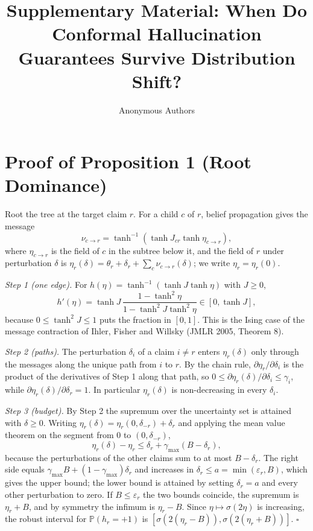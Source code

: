 \documentclass[journal,onecolumn,11pt]{IEEEtran}
\renewcommand{\Pr}{\mathbb{P}}
\begin{document}
\title{Supplementary Material: When Do Conformal Hallucination Guarantees Survive Distribution Shift?}
\author{Anonymous Authors}
\maketitle

\section{Proof of Proposition 1 (Root Dominance)}
Root the tree at the target claim $r$. For a child $c$ of $r$, belief propagation gives the message \[\nu_{c\to r}=\tanh^{-1}(\tanh J_{cr}\tanh\eta_{c\to r}),\] where $\eta_{c\to r}$ is the field of $c$ in the subtree below it, and the field of $r$ under perturbation $\delta$ is $\eta_r(\delta)=\theta_r+\delta_r+\sum_c\nu_{c\to r}(\delta)$; we write $\eta_r=\eta_r(0)$.

\emph{Step 1 (one edge).} For $h(\eta)=\tanh^{-1}(\tanh J\tanh\eta)$ with $J\ge0$,
\[
h'(\eta)=\tanh J\,\frac{1-\tanh^2\eta}{1-\tanh^2J\tanh^2\eta}\in[0,\tanh J],
\]
because $0\le\tanh^2J\le1$ puts the fraction in $[0,1]$. This is the Ising case of the message contraction of Ihler, Fisher and Willsky (JMLR 2005, Theorem 8).

\emph{Step 2 (paths).} The perturbation $\delta_i$ of a claim $i\ne r$ enters $\eta_r(\delta)$ only through the messages along the unique path from $i$ to $r$. By the chain rule, $\partial\eta_r/\partial\delta_i$ is the product of the derivatives of Step 1 along that path, so $0\le\partial\eta_r(\delta)/\partial\delta_i\le\gamma_i$, while $\partial\eta_r(\delta)/\partial\delta_r=1$. In particular $\eta_r(\delta)$ is non-decreasing in every $\delta_i$.

\emph{Step 3 (budget).} By Step 2 the supremum over the uncertainty set is attained with $\delta\ge0$. Writing $\eta_r(\delta)=\eta_r(0,\delta_{-r})+\delta_r$ and applying the mean value theorem on the segment from $0$ to $(0,\delta_{-r})$,
\[
\eta_r(\delta)-\eta_r\le\delta_r+\gamma_{\max}(B-\delta_r),
\]
because the perturbations of the other claims sum to at most $B-\delta_r$. The right side equals $\gamma_{\max}B+(1-\gamma_{\max})\delta_r$ and increases in $\delta_r\le a=\min(\varepsilon_r,B)$, which gives the upper bound; the lower bound is attained by setting $\delta_r=a$ and every other perturbation to zero. If $B\le\varepsilon_r$ the two bounds coincide, the supremum is $\eta_r+B$, and by symmetry the infimum is $\eta_r-B$. Since $\eta\mapsto\sigma(2\eta)$ is increasing, the robust interval for $\Pr(h_r=+1)$ is $[\sigma(2(\eta_r-B)),\sigma(2(\eta_r+B))]$. \hfill$\square$
\end{document}
